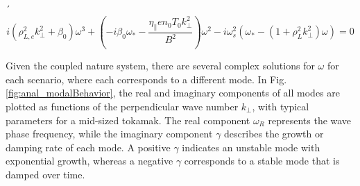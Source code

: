 ´\begin{equation}
	\label{eq:anal_DAWdispersionRelation}
	i\left(\rho_{L,e}^2k_\perp^2 + \beta_0\right)\omega^3 + \left(-i\beta_0\omega_* - \frac{\eta_\parallel en_0T_0k_\perp^2}{B^2}\right)\omega^2 - i\omega_s^2\left(\omega_*-\left(1 + \rho_L^2 k_\perp^2\right)\omega\right) = 0
\end{equation}


Given the coupled nature system, there are several complex solutions for $\omega$ for each scenario, where each corresponds to a different mode. In Fig. \ref{fig:anal_modalBehavior}, the real and imaginary components of all modes are plotted as functions of the perpendicular wave number $k_\perp$, with typical parameters for a mid-sized tokamak. The real component $\omega_R$ represents the wave phase frequency, while the imaginary component $\gamma$ describes the growth or damping rate of each mode. A positive $\gamma$ indicates an unstable mode with exponential growth, whereas a negative $\gamma$ corresponds to a stable mode that is damped over time.

